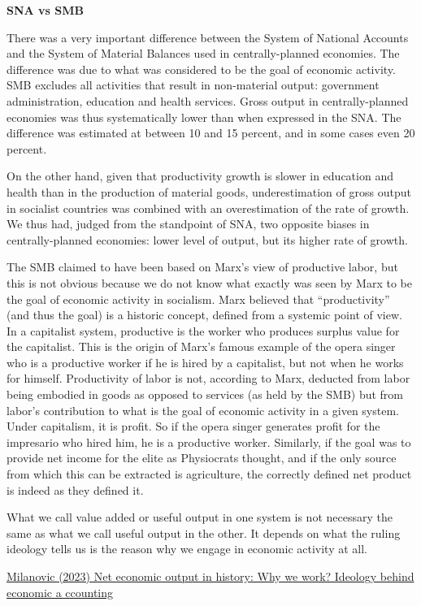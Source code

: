 \documentclass[
]{book}
\begin{document}
\textbf{SNA vs SMB}

There was a very important difference between the System of National Accounts and the System of Material Balances used in centrally-planned economies. The difference was due to what was considered to be the goal of economic activity. SMB excludes all activities that result in non-material output: government administration, education and health services. Gross output in centrally-planned economies was thus systematically lower than when expressed in the SNA. The difference was estimated at between 10 and 15 percent, and in some cases even 20 percent.

On the other hand, given that productivity growth is slower in education and health than in the production of material goods, underestimation of gross output in socialist countries was combined with an overestimation of the rate of growth. We thus had, judged from the standpoint of SNA, two opposite biases in centrally-planned economies: lower level of output, but its higher rate of growth.

The SMB claimed to have been based on Marx's view of productive labor, but this is not obvious because we do not know what exactly was seen by Marx to be the goal of economic activity in socialism. Marx believed that ``productivity'' (and thus the goal) is a historic concept, defined from a systemic point of view. In a capitalist system, productive is the worker who produces surplus value for the capitalist. This is the origin of Marx's famous example of the opera singer who is a productive worker if he is hired by a capitalist, but not when he works for himself. Productivity of labor is not, according to Marx, deducted from labor being embodied in goods as opposed to services (as held by the SMB) but from labor's contribution to what is the goal of economic activity in a given system. Under capitalism, it is profit. So if the opera singer generates profit for the impresario who hired him, he is a productive worker. Similarly, if the goal was to provide net income for the elite as Physiocrats thought, and if the only source from which this can be extracted is agriculture, the correctly defined net product is indeed as they defined it.

What we call value added or useful output in one system is not necessary the same as what we call useful output in the other. It depends on what the ruling ideology tells us is the reason why we engage in economic activity at all.

\href{https://branko2f7.substack.com/p/net-economic-output-as-a-historic}{Milanovic (2023) Net economic output in history: Why we work? Ideology behind economic a
ccounting}
\end{document}
